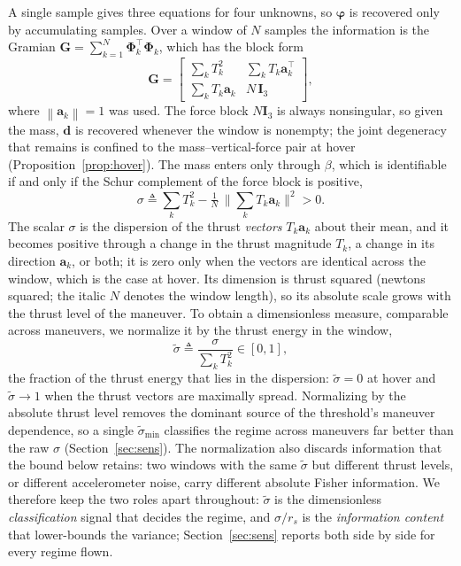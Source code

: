 \documentclass{ieeeaccess}
\newcommand{\norm}[1]{\left\| #1 \right\|}
\newcommand{\vect}[1]{\bm{#1}}
\newcommand{\mat}[1]{\mathbf{#1}}
\begin{document}
A single sample gives three equations for four unknowns, so $\vect{\varphi}$ is
recovered only by accumulating samples. Over a window of $N$ samples the
information is the Gramian $\mat{G}=\sum_{k=1}^{N}\mat{\Phi}_k^{\!\top}\mat{\Phi}_k$,
which has the block form
\begin{equation}
\mat{G}=
\begin{bmatrix}
\sum_k T_k^2 & \sum_k T_k\vect{a}_k^{\!\top}\\[2pt]
\sum_k T_k\vect{a}_k & N\,\mat{I}_3
\end{bmatrix},
\label{eq:gramian}
\end{equation}
where $\norm{\vect{a}_k}=1$ was used. The force block $N\mat{I}_3$ is always
nonsingular, so given the mass, $\vect{d}$ is recovered whenever the
window is nonempty; the joint degeneracy that remains is confined to the
mass--vertical-force pair at hover (Proposition~\ref{prop:hover}). The
mass enters only through $\beta$, which is identifiable if and only if the Schur
complement of the force block is positive,
\begin{equation}
\sigma \triangleq \sum_k T_k^2 - \tfrac{1}{N}\,\Big\|\textstyle\sum_k T_k\vect{a}_k\Big\|^2 > 0 .
\label{eq:schur}
\end{equation}
The scalar $\sigma$ is the dispersion of the thrust \emph{vectors} $T_k\vect{a}_k$
about their mean, and it becomes positive through a change in the thrust
magnitude $T_k$, a change in its direction $\vect{a}_k$, or both; it is zero only
when the vectors are identical across the window, which is the case at hover. Its dimension is thrust squared (newtons squared; the italic $N$ denotes the window length), so its
absolute scale grows with the thrust level of the maneuver. To obtain a
dimensionless measure, comparable across maneuvers, we normalize it by the
thrust energy in the window,
\begin{equation}
\tilde\sigma \triangleq \frac{\sigma}{\sum_k T_k^2}\in[0,1],
\label{eq:snorm}
\end{equation}
the fraction of the thrust energy that lies in the dispersion: $\tilde\sigma=0$
at hover and $\tilde\sigma\!\to\!1$ when the thrust vectors are maximally spread.
Normalizing by the absolute thrust level removes the dominant source of the
threshold's maneuver dependence, so a single $\tilde\sigma_{\min}$ classifies the
regime across maneuvers far better than the raw $\sigma$
(Section~\ref{sec:sens}). The normalization also discards information that the
bound below retains: two windows with the same $\tilde\sigma$ but different thrust
levels, or different accelerometer noise, carry different absolute Fisher
information. We therefore keep the two roles apart throughout: $\tilde\sigma$ is the
dimensionless \emph{classification} signal that decides the regime, and
$\sigma/r_s$ is the \emph{information content} that lower-bounds the variance;
Section~\ref{sec:sens} reports both side by side for every regime flown.
\end{document}
